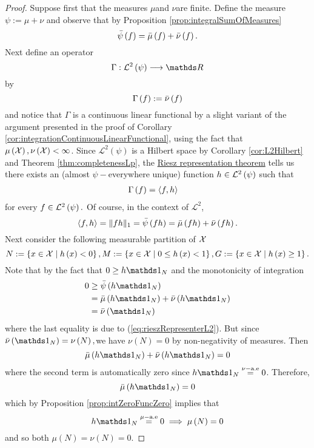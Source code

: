 \begin{proof}
Suppose first that the measures $\mu$and $\nu$are finite. Define
the measure $\psi:=\mu+\nu$ and observe that by Proposition \ref{prop:integralSumOfMeasures}
\[
\bar{\psi}\left(f\right)=\bar{\mu}\left(f\right)+\bar{\nu}\left(f\right).
\]
Next define an operator 
\[
\Gamma:\Lp 2{\psi}\longrightarrow\R
\]
by
\[
\Gamma\left(f\right):=\bar{\nu}\left(f\right)
\]
and notice that $\Gamma$ is a continuous linear functional by a slight
variant of the argument presented in the proof of Corollary \ref{cor:integrationContinuousLinearFunctional},
using the fact that $\mu\left(\mathcal{X}\right),\nu\left(\mathcal{X}\right)<\infty$.
Since $\mathcal{L}^{2}\left(\psi\right)$ is a Hilbert space by Corollary
\ref{cor:L2Hilbert} and Theorem \ref{thm:completenessLp}, the \hyperref[thm:rieszRep]{Riesz representation theorem} tells
us there exists an (almost $\psi-$everywhere unique) function $h\in\mathcal{L}^{2}\left(\psi\right)$
such that
\begin{align*}
\Gamma\left(f\right) & =\langle f,h\rangle
\end{align*}
for every $f\in\mathcal{L}^{2}\left(\psi\right).$ Of course, in the context of $\mathcal{L}^{2}$,
\begin{equation}
\langle f,h\rangle=\lVert fh\rVert_{1}=\bar{\psi}\left(fh\right)=\bar{\mu}\left(fh\right)+\bar{\nu}\left(fh\right).\label{eq:rieszRepresenterL2}
\end{equation}
Next consider the following measurable partition of $\mathcal{X}$
\[
N:=\left\{ x\in\mathcal{X}\mid h\left(x\right)<0\right\} ,M:=\left\{ x\in\mathcal{X}\mid0\leq h\left(x\right)<1\right\} ,G:=\left\{ x\in\mathcal{X}\mid h\left(x\right)\geq1\right\} .
\]
Note that by the fact that $0\geq h\indicate_{N}$ and the monotonicity
of integration
\begin{align*}
0 & \geq\lebInt{\psi}{h\indicate_{N}}\\
 & =\lebInt{\mu}{h\indicate_{N}}+\lebInt{\nu}{h\indicate_{N}}\\
 & =\lebInt{\nu}{\indicate_{N}}
\end{align*}
where the last equality is due to (\ref{eq:rieszRepresenterL2}).
But since $\lebInt{\nu}{\indicate_{N}}=\nu\left(N\right),$we have
$\nu\left(N\right)=0$ by non-negativity of measures. Then
\[
\lebInt{\mu}{h\indicate_{N}}+\lebInt{\nu}{h\indicate_{N}}=0
\]
where the second term is automatically zero since $h\indicate_{N}\stackrel{\nu-\text{a.e}}{=}0$.
Therefore, 
\[
\lebInt{\mu}{h\indicate_{N}}=0
\]
which by Proposition \ref{prop:intZeroFuncZero} implies that
\[
h\indicate_{N}\stackrel{\mu-\text{a.e}}{=}0\implies\mu\left(N\right)=0
\]
and so both $\mu\left(N\right)=\nu\left(N\right)=0.$


\end{proof}

